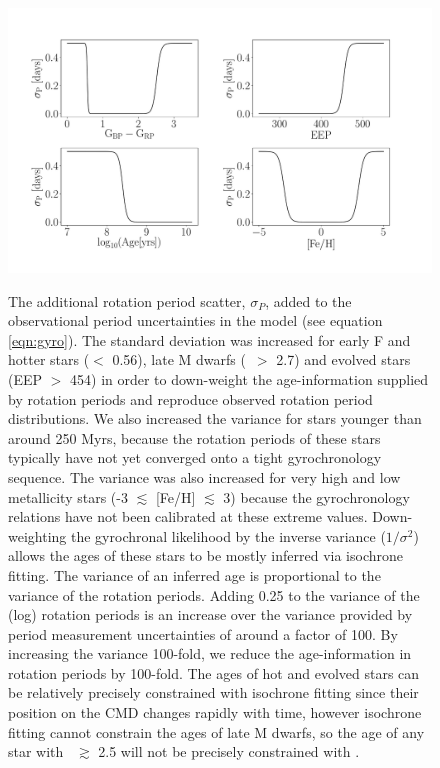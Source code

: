 \begin{figure}
  \caption{
    The additional rotation period scatter, $\sigma_P$, added to the
    observational period uncertainties in the model (see equation
    \ref{eqn:gyro}).
    The standard deviation was increased for early F and hotter
    stars (\gcolor $<$ 0.56), late M dwarfs (\gcolor\ $>$ 2.7) and evolved
    stars (EEP $>$ 454) in order to down-weight the age-information supplied
    by rotation periods and reproduce observed rotation period distributions.
    We also increased the variance for stars younger than around 250 Myrs,
    because the rotation periods of these stars typically have not yet
    converged onto a tight gyrochronology sequence.
    The variance was also increased for very high and low metallicity stars
    (-3 $\lesssim$ [Fe/H] $\lesssim$ 3) because the gyrochronology relations
    have not been calibrated at these extreme values.
    Down-weighting the gyrochronal likelihood by the inverse variance
    ($1/\sigma^2$) allows the ages of these stars to be mostly inferred
    via isochrone fitting.
    The variance of an inferred age is proportional to the
    variance of the rotation periods.
    Adding 0.25 to the variance of the (log) rotation periods is an increase
    over the variance provided by period measurement uncertainties of around
    a factor of 100.
    By increasing the variance 100-fold, we reduce the age-information in
    rotation periods by 100-fold.
    The ages of hot and evolved stars can be relatively precisely constrained
    with isochrone fitting since their position on the CMD changes rapidly
    with time, however isochrone fitting cannot constrain the ages of
    late M dwarfs, so the age of any star with \gcolor\ $\gtrsim$ 2.5 will not
    be precisely constrained with \sd.
}
  \centering
    \includegraphics[width=1.\textwidth]{variance}
\label{fig:variance}
\end{figure}

